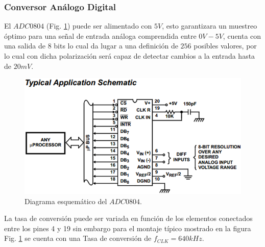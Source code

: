 \documentclass[twocolumn]{IEEEtran}
\begin{document}
\subsubsection{Conversor Análogo Digital} \label{ADC}
El $ADC 0804$ (Fig. \ref{fig2}) puede ser alimentado con $5 V$, esto garantizara un muestreo óptimo para una señal de entrada análoga comprendida entre $0V - 5 V$, cuenta con una salida de $8$ bits lo cual da lugar a una definición de $256$ posibles valores, por lo cual con dicha polarización será capaz de detectar cambios a la entrada  hasta de $20mV$.
\begin{figure}[]
	\centering
		\includegraphics[scale=0.4]{ADC.png}
	\caption{Diagrama esquemático del $ADC0804$.}
	\label{fig2}
\end{figure}
\noindent
La tasa de conversión puede ser variada en función de los elementos conectados entre los pines  4 y 19 sin embargo para el montaje típico mostrado en la figura Fig. \ref{fig2} se cuenta con una Tasa de conversión de $f_{CLK} = 640kHz$.
\end{document}
